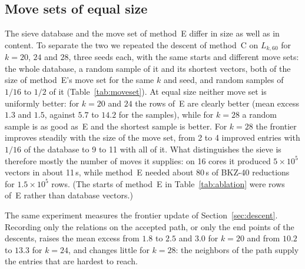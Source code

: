 \documentclass[11pt]{amsart}
\theoremstyle{definition}
\theoremstyle{remark}
\begin{document}
\subsection{Move sets of equal size}\label{sec:moveset}
The sieve database and the move set of method~E differ in size as well as in content. To
separate the two we repeated the descent of method~C on $L_{k,60}$ for $k=20$, $24$ and $28$,
three seeds each, with the same starts and different move sets: the whole database, a random
sample of it and its shortest vectors, both of the size of method~E's move set for the same $k$
and seed, and random samples of $1/16$ to $1/2$ of it (Table~\ref{tab:moveset}). At equal size neither
move set is uniformly better: for $k=20$ and $24$ the rows of~E are clearly better (mean excess
$1.3$ and $1.5$, against $5.7$ to $14.2$ for the samples), while for $k=28$ a random sample is as
good as~E and the shortest sample is better. For $k=28$ the frontier
improves steadily with the size of the move set, from 2 to 4 improved entries with $1/16$ of
the database to 9 to 11 with all of it. What distinguishes the sieve is therefore mostly the
number of moves it supplies: on 16 cores it produced $5\times10^5$ vectors in about 11\,s,
while method~E needed about 80\,s of BKZ-40 reductions for $1.5\times10^5$ rows. (The starts of
method~E in Table~\ref{tab:ablation} were rows of~E rather than database vectors.)

The same experiment measures the frontier update of Section~\ref{sec:descent}. Recording only
the relations on the accepted path, or only the end points of the descents, raises the mean
excess from $1.8$ to $2.5$ and $3.0$ for $k=20$ and from $10.2$ to $13.3$ for $k=24$, and changes
little for $k=28$: the neighbors of the path supply the entries that are hardest to reach.

\begin{table}[htbp]
\centering\small

\caption{The descent of method~C on $L_{k,60}$, three seeds per power, with different move sets
and the same starts (the BKZ-20 rows and 300 database vectors). ``Moves'': mean size of the move
set, where $|E|$ is the size of method~E's move set for the same $k$ and seed. ``Improved'' and
``reached'' as in Table~\ref{tab:ablation}. ``Excess'': mean of $n-n_{\mathrm{table}}$ over the
entries reached by all six variants with a value in this column, with the standard deviation
over the seeds; the number in parentheses after $k$ is the number of these entries. The last two
rows update the frontier only on the accepted path or only at the end points of each descent.
The row for~E is the run of method~E in Table~\ref{tab:ablation}, whose starts were rows of~E;
its excess is taken over the entries of this table and so differs slightly from
Table~\ref{tab:ablation}.}\label{tab:moveset}
\end{table}
\end{document}
